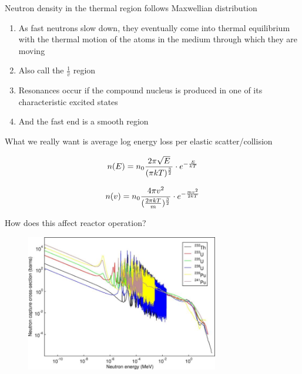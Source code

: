 \documentclass[aspectratio=1610,pdftex,dvipsnames,compress,xcolor={dvipsnames}]{beamer}
\begin{document}
\addtocounter{framenumber}{-1} 
\begin{frame}{Neutron density in the thermal region follows Maxwellian distribution}
    \begin{enumerate}[series=outerlist,topsep=0pt,itemsep=21pt,leftmargin=*,label=(\arabic*)]
        \item[]As fast neutrons slow down, they eventually come into thermal equilibrium with the thermal motion of the atoms in the medium through which they are moving
        \item[]Also call the $\frac{1}{v}$ region
        \item[]Resonances occur if the compound nucleus is produced in one of its characteristic excited states
        \item[]And the fast end is a smooth region
    \end{enumerate}
\end{frame}


\begin{frame}{What we really want is average log energy loss per elastic scatter/collision}

    \begin{equation}
        \LARGE
        n(E) = n_0 \frac{2\pi\sqrt{E}}{(\pi kT)^{\frac{3}{2}}} \cdot e^{-\frac{E}{kT}}
    \end{equation}

    \vspace*{\fill}

    \begin{equation}
        \LARGE
        n(v) = n_0 \frac{4\pi v^2}{(\frac{2\pi kT}{m})^{\frac{3}{2}}} \cdot e^{-\frac{mv^2}{2kT}}
    \end{equation}

\end{frame}


\begin{frame}{How does this affect reactor operation?}
    \begin{figure}
        \centering
        \includegraphics[width=0.75\textwidth]{capture.cross.section.jpg}
    \end{figure}
\end{frame}
\end{document}
